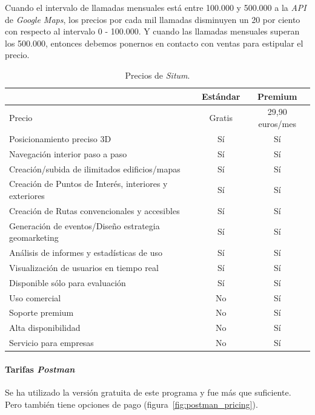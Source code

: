 Cuando el intervalo de llamadas mensuales está entre 100.000 y 500.000 a la \textit{API} de \textit{Google Maps}, los precios por cada mil llamadas disminuyen un 20 por ciento con respecto al intervalo 0 - 100.000. Y cuando las llamadas mensuales superan los 500.000, entonces debemos ponernos en contacto con ventas para estipular el precio.

\begin{table}[t]
\begin{center}
\small
\begin{tabular}{|l|c|c|}
\hline 
& Estándar & Premium \\
\hline \hline
Precio & Gratis & 29,90 euros/mes \\ \hline
Posicionamiento preciso 3D & Sí & Sí \\ \hline
Navegación interior paso a paso & Sí & Sí \\ \hline
Creación/subida de ilimitados edificios/mapas & Sí & Sí   \\ \hline
Creación de Puntos de Interés, interiores y exteriores & Sí & Sí  \\ \hline
Creación de Rutas convencionales y accesibles & Sí & Sí   \\ \hline
Generación de eventos/Diseño estrategia geomarketing & Sí & Sí   \\ \hline
Análisis de informes y estadísticas de uso & Sí & Sí  \\ \hline
Visualización de usuarios en tiempo real & Sí & Sí  \\ \hline
Disponible sólo para evaluación & Sí & Sí   \\ \hline
Uso comercial & No & Sí   \\ \hline
Soporte premium & No & Sí   \\ \hline
Alta disponibilidad & No & Sí   \\ \hline
Servicio para empresas & No & Sí   \\ \hline
\end{tabular}
\caption{Precios de \textit{Situm}.}
\label{precios:situm}
\end{center}
\end{table}

\paragraph{Tarifas \textit{Postman}}
Se ha utilizado la versión gratuita de este programa y fue más que suficiente. Pero también tiene opciones de pago  (figura~\ref{fig:postman_pricing}).

